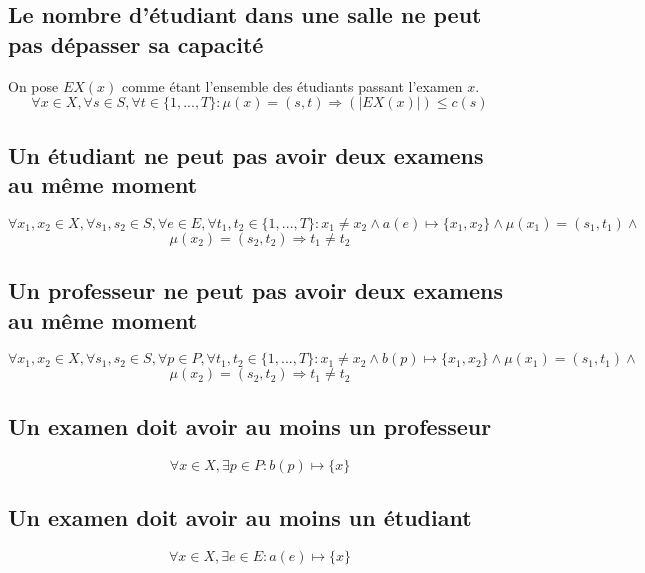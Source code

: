 \documentclass[a4paper,11pt]{article}
\begin{document}
\subsection {Le nombre d'étudiant dans une salle ne peut pas dépasser sa capacité}
On pose $ EX(x) $ comme étant l'ensemble des étudiants passant l'examen $x$.
\begin{displaymath}
\forall x \in X , \forall s \in S, \forall t \in \{1,...,T\} : \mu(x) = (s,t) \Rightarrow (|EX(x)|) \leq c(s)
\end{displaymath}	

\subsection {Un étudiant ne peut pas avoir deux examens au même moment}
\begin{displaymath}
\forall x_{1},x_{2} \in X, \forall s_{1},s_{2} \in S , \forall e \in E ,\forall t_{1}, t_{2} \in \{1,...,T\} :  x_{1} \neq x_{2} \wedge a(e) \mapsto \{x_{1},x_{2}\}  \wedge \mu(x_{1}) = (s_{1},t_{1}) \wedge\end{displaymath}
\begin{displaymath}
 \mu(x_{2}) = (s_{2},t_{2}) \Rightarrow t_{1} \neq t_{2} 
\end{displaymath}

\subsection {Un professeur ne peut pas avoir deux examens au même moment}
\begin{displaymath}
\forall x_{1},x_{2} \in X, \forall s_{1},s_{2} \in S , \forall p \in P ,\forall t_{1}, t_{2} \in \{1,...,T\} :  x_{1} \neq x_{2} \wedge b(p) \mapsto \{x_{1},x_{2}\}  \wedge \mu(x_{1}) = (s_{1},t_{1}) \wedge\end{displaymath}
\begin{displaymath}
 \mu(x_{2}) = (s_{2},t_{2}) \Rightarrow t_{1} \neq t_{2} 
\end{displaymath}

\subsection {Un examen doit avoir au moins un professeur}
\begin{displaymath}
\forall x \in X, \exists p \in P : b(p) \mapsto \{x\} 
\end{displaymath}

\subsection {Un examen doit avoir au moins un étudiant}
\begin{displaymath}
\forall x \in X, \exists e \in E : a(e) \mapsto \{x\}
\end{displaymath}
\end{document}

